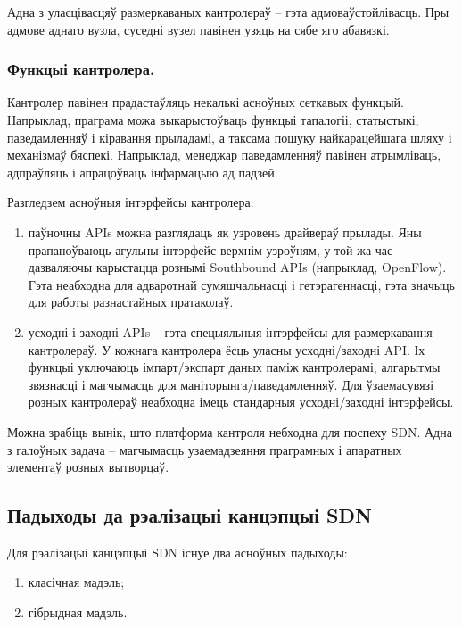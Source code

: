 Адна з уласцівасцяў размеркаваных кантролераў -- гэта адмоваўстойлівасць.
Пры адмове аднаго вузла, суседні вузел павінен узяць на сябе яго абавязкі.

\subsubsection{Функцыі кантролера.}

Кантролер павінен прадастаўляць некалькі асноўных сеткавых функцый.
Напрыклад, праграма можа выкарыстоўваць функцыі тапалогіі, статыстыкі, паведамленняў і
кіравання прыладамі, а таксама пошуку найкарацейшага шляху і механізмаў бяспекі.
Напрыклад, менеджар паведамленняў павінен атрымліваць, адпраўляць і апрацоўваць
інфармацыю ад падзей.

Разгледзем асноўныя інтэрфейсы кантролера:
\begin{enumerate}
    \item паўночны APIs можна разглядаць як узровень драйвераў прылады.
    Яны прапаноўваюць агульны інтэрфейс верхнім узроўням, у той жа час дазваляючы
    карыстацца рознымі Southbound APIs (напрыклад, OpenFlow). Гэта неабходна для
    адваротнай сумяшчальнасці і гетэрагеннасці, гэта значыць для работы разнастайных
    пратаколаў.
    \item усходні і заходні APIs -- гэта спецыяльныя інтэрфейсы для размеркавання
    кантролераў. У кожнага кантролера ёсць уласны усходні/заходні API. Іх функцыі уключаюць
    імпарт/экспарт даных паміж кантролерамі, алгарытмы звязнасці і магчымасць для
    маніторынга/паведамленняў. Для ўзаемасувязі розных кантролераў неабходна
    імець стандарныя усходні/\-заходні інтэрфейсы.
\end{enumerate}

Можна зрабіць вынік, што платформа кантроля небходна для поспеху SDN. Адна з галоўных
задача -- магчымасць узаемадзеяння праграмных і апаратных элементаў розных вытворцаў.

\subsection{Падыходы да рэалізацыі канцэпцыі SDN}

Для рэалізацыі канцэпцыі SDN існуе два асноўных падыходы:
\begin{enumerate}
    \item класічная мадэль;
    \item гібрыдная мадэль.
\end{enumerate}

